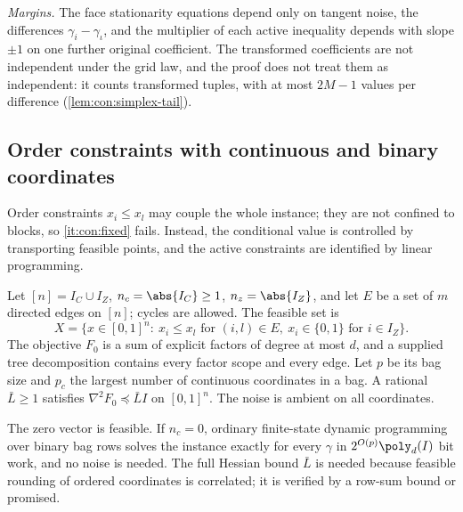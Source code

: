 \emph{Margins.} The face stationarity equations depend only on tangent noise,
the differences $\gamma_i-\gamma_\iota$, and the multiplier of each active
inequality depends with slope $\pm1$ on one further original coefficient.
The transformed coefficients are not independent under the grid law, and
the proof does not treat them as independent: it counts transformed tuples,
with at most $2M-1$ values per difference (\cref{lem:con:simplex-tail}).

\subsection{Order constraints with continuous and binary coordinates}\label{sec:con:order}

Order constraints $x_i\le x_l$ may couple the whole instance; they are not
confined to blocks, so \ref{it:con:fixed} fails. Instead, the conditional
value is controlled by transporting feasible points, and the active
constraints are identified by linear programming.

\begin{definition}\label{def:con:order}
Let $[n]=I_C\cup I_Z$, $n_c=\abs{I_C}\ge1$, $n_z=\abs{I_Z}$, and let $E$ be a
set of $m$ directed edges on $[n]$; cycles are allowed. The feasible set is
\[
 X=\{x\in[0,1]^n:\ x_i\le x_l\text{ for }(i,l)\in E,\ x_i\in\{0,1\}
 \text{ for }i\in I_Z\}.
\]
The objective $F_0$ is a sum of explicit factors of degree at most $d$, and
a supplied tree decomposition contains every factor scope and every edge.
Let $p$ be its bag size and $p_c$ the largest number of continuous
coordinates in a bag. A rational $\bar L\ge1$ satisfies
$\nabla^2F_0\preceq\bar LI$ on $[0,1]^n$. The noise is ambient on all
coordinates.
\end{definition}

The zero vector is feasible. If $n_c=0$, ordinary finite-state dynamic
programming over binary bag rows solves the instance exactly for every
$\gamma$ in $2^{O(p)}\poly_d(I)$ bit work, and no noise is needed. The full
Hessian bound $\bar L$ is needed because feasible rounding of ordered
coordinates is correlated; it is verified by a row-sum bound or promised.

